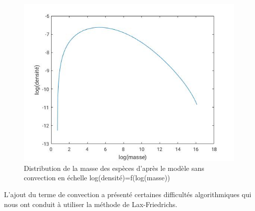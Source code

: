 \documentclass[fleqn,10pt]{SelfArx}
\begin{document}
\begin{figure}[H]
\includegraphics[scale=0.4]{courbe_dirneu_sans.jpg}
\caption{Distribution de la masse des espèces d'après le modèle sans convection en échelle log(densité)=f(log(masse))}
\end{figure}

L'ajout du terme de convection a présenté certaines difficultés algorithmiques qui nous ont conduit à utiliser la méthode de Lax-Friedrichs.
\end{document}
